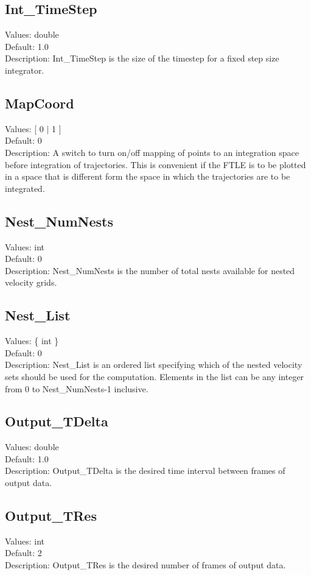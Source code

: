 \documentclass[11pt]{article}
\begin{document}
\subsection{Int\_TimeStep}
Values:   double \\
Default:  1.0\\
Description:  Int\_TimeStep is the size of the timestep for a fixed step size integrator.

\subsection{MapCoord}
Values:   [ 0 $|$ 1 ] \\
Default:  0\\
Description:  A switch to turn on/off mapping of points to an integration space before integration of trajectories.  This is convenient if the FTLE is to be plotted in a space that is different form the space in which the trajectories are to be integrated.

\subsection{Nest\_NumNests}
Values:   int \\
Default:  0\\
Description:  Nest\_NumNests is the number of total nests available for nested velocity grids.

\subsection{Nest\_List}
Values:  \{ int \} \\
Default:  0\\
Description:  Nest\_List is an ordered list specifying which of the nested velocity sets should be used for the computation.  Elements in the list can be any integer from 0 to Nest\_NumNests-1 inclusive.

\subsection{Output\_TDelta}
Values:   double \\
Default:  1.0\\
Description:  Output\_TDelta is the desired time interval between frames of output data.

\subsection{Output\_TRes}
Values:   int \\
Default:  2\\
Description:  Output\_TRes is the desired number of frames of output data.
\end{document}
